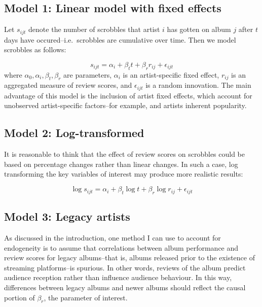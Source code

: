 \documentclass[
  11pt,
]{article}
\begin{document}
\hypertarget{model-1-linear-model-with-fixed-effects}{%
\subsection{Model 1: Linear model with fixed
effects}\label{model-1-linear-model-with-fixed-effects}}

Let \(s_{ijt}\) denote the number of scrobbles that artist \(i\) has
gotten on album \(j\) after \(t\) days have occured--i.e.~scrobbles are
cumulative over time. Then we model scrobbles as follows:

\[s_{ijt} = \alpha_i + \beta_t t + \beta_r r_{ij} + \epsilon_{ijt}\]
where \(\alpha_0, \alpha_i, \beta_t, \beta_r\) are parameters,
\(\alpha_i\) is an artist-specific fixed effect, \(r_{ij}\) is an
aggregated measure of review scores, and \(\epsilon_{ijt}\) is a random
innovation. The main advantage of this model is the inclusion of artist
fixed effects, which account for unobserved artist-specific factors--for
example, and artists inherent popularity.

\hypertarget{model-2-log-transformed}{%
\subsection{Model 2: Log-transformed}\label{model-2-log-transformed}}

It is reasonable to think that the effect of review scores on scrobbles
could be based on percentage changes rather than linear changes. In such
a case, log transforming the key variables of interest may produce more
realistic results:

\[\log s_{ijt} = \alpha_i + \beta_t \log t + \beta_r \log r_{ij} + \epsilon_{ijt}\]

\hypertarget{model-3-legacy-artists}{%
\subsection{Model 3: Legacy artists}\label{model-3-legacy-artists}}

As discussed in the introduction, one method I can use to account for
endogeneity is to assume that correlations between album performance and
review scores for legacy albums--that is, albums released prior to the
existence of streaming platforms--is spurious. In other words, reviews
of the album predict audience reception rather than influence audience
behaviour. In this way, differences between legacy albums and newer
albums should reflect the causal portion of \(\beta_r\), the parameter
of interest.
\end{document}

